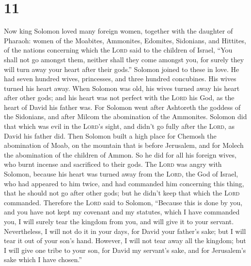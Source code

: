 \hypertarget{section-10}{%
\section{11}\label{section-10}}

 Now king Solomon loved many foreign women, together with
the daughter of Pharaoh: women of the Moabites, Ammonites, Edomites,
Sidonians, and Hittites,  of the nations concerning which
the \textsc{Lord} said to the children of Israel, ``You shall not go
amongst them, neither shall they come amongst you, for surely they will
turn away your heart after their gods.'' Solomon joined to these in
love.  He had seven hundred wives, princesses, and three
hundred concubines. His wives turned his heart away.  When
Solomon was old, his wives turned away his heart after other gods; and
his heart was not perfect with the \textsc{Lord} his God, as the heart
of David his father was.  For Solomon went after Ashtoreth
the goddess of the Sidonians, and after Milcom the abomination of the
Ammonites.  Solomon did that which was evil in the
\textsc{Lord}'s sight, and didn't go fully after the \textsc{Lord}, as
David his father did.  Then Solomon built a high place for
Chemosh the abomination of Moab, on the mountain that is before
Jerusalem, and for Molech the abomination of the children of Ammon.
 So he did for all his foreign wives, who burnt incense
and sacrificed to their gods.  The \textsc{Lord} was angry
with Solomon, because his heart was turned away from the \textsc{Lord},
the God of Israel, who had appeared to him twice,  and
had commanded him concerning this thing, that he should not go after
other gods; but he didn't keep that which the \textsc{Lord} commanded.
 Therefore the \textsc{Lord} said to Solomon, ``Because
this is done by you, and you have not kept my covenant and my statutes,
which I have commanded you, I will surely tear the kingdom from you, and
will give it to your servant.  Nevertheless, I will not
do it in your days, for David your father's sake; but I will tear it out
of your son's hand.  However, I will not tear away all
the kingdom; but I will give one tribe to your son, for David my
servant's sake, and for Jerusalem's sake which I have chosen.''

